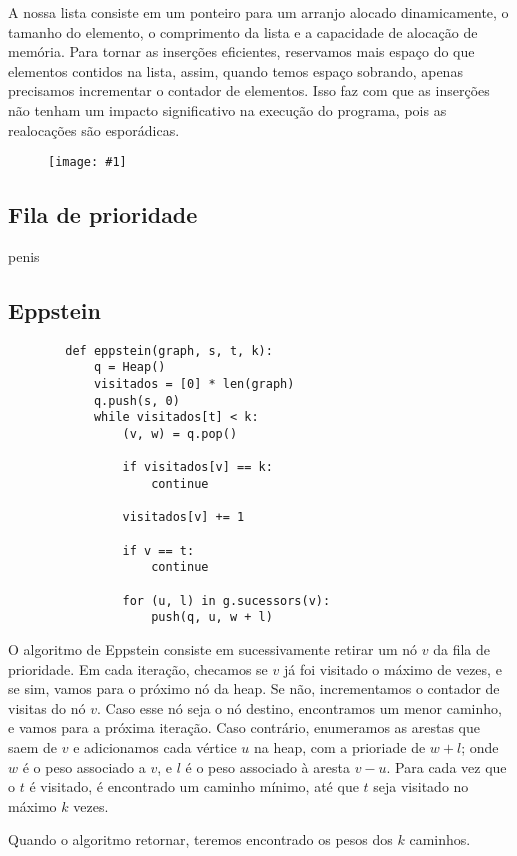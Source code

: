 \documentclass[12pt]{article}
\newcommand\image[2]{\noindent \begin{figure}[h]
    \texttt{[image: \#1]}
    \label{fig: #1}
    \caption{#2}
    \end{figure}
    }
\begin{document}
    A nossa lista consiste em um ponteiro para um arranjo alocado dinamicamente,
    o tamanho do elemento, o comprimento da lista e a capacidade de alocação de
    memória. Para tornar as inserções eficientes, reservamos mais espaço do que
    elementos contidos na lista, assim, quando temos espaço sobrando, apenas
    precisamos incrementar o contador de elementos. Isso faz com que as
    inserções não tenham um impacto significativo na execução do programa, pois
    as realocações são esporádicas.

    \image{lista}

    \newpage

    \subsection{Fila de prioridade}
    penis

    \newpage
    \subsection{Eppstein}
    \begin{verbatim}
        def eppstein(graph, s, t, k):
            q = Heap()
            visitados = [0] * len(graph)
            q.push(s, 0)
            while visitados[t] < k:
                (v, w) = q.pop()

                if visitados[v] == k:
                    continue 

                visitados[v] += 1

                if v == t:
                    continue

                for (u, l) in g.sucessors(v):
                    push(q, u, w + l)
    \end{verbatim}
    O algoritmo de Eppstein consiste em sucessivamente retirar um nó $v$ da fila
    de prioridade. Em cada iteração, checamos se $v$ já foi visitado o máximo de
    vezes, e se sim, vamos para o próximo nó da heap. Se não, incrementamos o
    contador de visitas do nó $v$. Caso esse nó seja o nó destino, encontramos
    um menor caminho, e vamos para a próxima iteração. Caso contrário,
    enumeramos as arestas que saem de $v$ e adicionamos cada vértice $u$ na
    heap, com a prioriade de $w + l$; onde $w$ é o peso associado a $v$, e $l$ é
    o peso associado à aresta $v - u$. Para cada vez que o $t$ é visitado, é
    encontrado um caminho mínimo, até que $t$ seja visitado no máximo $k$ vezes.

    Quando o algoritmo retornar, teremos encontrado os pesos dos $k$ caminhos.
\end{document}
